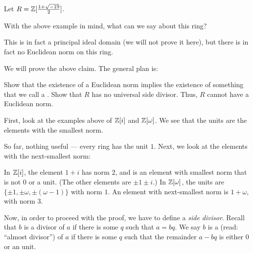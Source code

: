 \begin{example}
	Let $R = \mathbb Z[\frac{1 + \sqrt{-19}}{2}]$.

	With the above example in mind, what can we say about this ring?

	This is in fact a principal ideal domain (we will not prove it here), but there is in fact no
	Euclidean norm on this ring.
\end{example}

We will prove the above claim. The general plan is:
\begin{itemize}
	\ii Show that the existence of a Euclidean norm implies the existence of something that we
	call a .
	\ii Show that $R$ has no universal side divisor.
	\ii Thus, $R$ cannot have a Euclidean norm.
\end{itemize}

First, look at the examples above of $\mathbb Z[i]$ and $\mathbb Z[\omega]$. We see that the units are the
elements with the smallest norm.

So far, nothing useful --- every ring has the unit $1$. Next, we look at the elements with the
next-smallest norm:
\begin{itemize}
	\ii In $\mathbb Z[i]$, the element $1 + i$ has norm $2$, and is an element with smallest norm that is
	not $0$ or a unit. (The other elements are $\pm 1 \pm i$.)
	\ii In $\mathbb Z[\omega]$, the units are $\{ \pm 1, \pm \omega, \pm (\omega-1) \}$ with norm $1$. An
	element with next-smallest norm is $1 + \omega$, with norm $3$.
\end{itemize}

Now, in order to proceed with the proof, we have to define a \emph{side divisor}.
Recall that $b$ is a divisor of $a$ if there is some $q$ such that $a = bq$.
We say $b$ is a  (read: ``almost divisor'') of $a$ if there is some $q$ such
that the remainder $a-bq$ is either $0$ or an unit.

